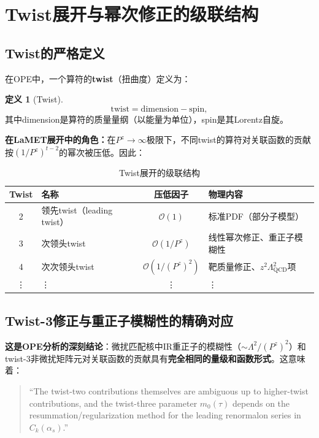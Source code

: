 \documentclass[12pt,a4paper]{ctexart}
\theoremstyle{definition}
\newtheorem{definition}{定义}[section]
\begin{document}
\section{Twist展开与幂次修正的级联结构}

\subsection{Twist的严格定义}

在OPE中，一个算符的\textbf{twist}（扭曲度）定义为：

\begin{definition}[Twist]
\begin{equation}
\boxed{\text{twist} = \text{dimension} - \text{spin}},
\label{eq:twist_definition}
\end{equation}
其中dimension是算符的质量量纲（以能量为单位），spin是其Lorentz自旋。
\end{definition}

\textbf{在LaMET展开中的角色：}在$P^z \to \infty$极限下，不同twist的算符对关联函数的贡献按$(1/P^z)^{t-2}$的幂次被压低。因此：

\begin{table}[H]
\centering
\caption{Twist展开的级联结构}
\label{tab:twist_hierarchy}
\begin{tabular}{clcl}
\toprule
Twist & 名称 & 压低因子 & 物理内容 \\
\midrule
2 & 领先twist（leading twist）& $\mathcal{O}(1)$ & 标准PDF（部分子模型） \\
3 & 次领头twist & $\mathcal{O}(1/P^z)$ & 线性幂次修正、重正子模糊性 \\
4 & 次次领头twist & $\mathcal{O}(1/(P^z)^2)$ & 靶质量修正、$z^2\Lambda_{\text{QCD}}^2$项 \\
\vdots & \vdots & \vdots & \vdots \\
\bottomrule
\end{tabular}
\end{table}

\subsection{Twist-3修正与重正子模糊性的精确对应}

\textbf{这是OPE分析的深刻结论}\cite{Zhang2023RGR,Braun2019power}：微扰匹配核中IR重正子的模糊性（$\sim \Lambda^2/(P^z)^2$）和twist-3非微扰矩阵元对关联函数的贡献具有\textbf{完全相同的量级和函数形式}。这意味着：

\begin{quote}
``The twist-two contributions themselves are ambiguous up to higher-twist contributions, and the twist-three parameter $m_0(\tau)$ depends on the resummation/regularization method for the leading renormalon series in $C_k(\alpha_s)$.''\cite{Zhang2023RGR}
\end{quote}
\end{document}
